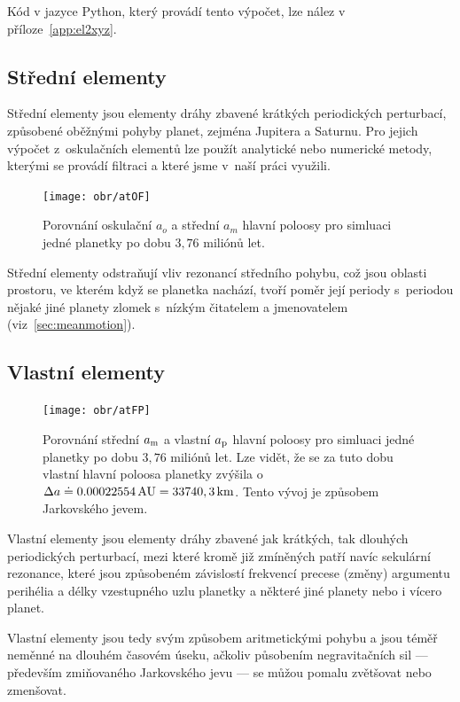 \documentclass[A4paper, 12pt, oneside]{book}%
\begin{document}
Kód v jazyce Python, který provádí tento výpočet, lze nález v příloze~\ref{app:el2xyz}.

\subsection{Střední elementy}
Střední elementy jsou elementy dráhy zbavené krátkých periodických perturbací, způsobené oběžnými pohyby planet, zejména Jupitera a Saturnu. Pro jejich výpočet z~oskulačních elementů lze použít analytické nebo numerické metody, kterými se provádí filtraci a které jsme v~naší práci využili. 

\begin{figure}
	\centering
	\texttt{[image: obr/atOF]}
	\caption{Porovnání oskulační $a_o$ a střední $a_m$ hlavní poloosy  pro simluaci jedné planetky po dobu $3,76$ miliónů let.}
	\label{atOF}
\end{figure}

Střední elementy odstraňují vliv rezonancí středního pohybu, což jsou oblasti prostoru, ve kterém když se planetka nachází, tvoří poměr její periody s~periodou nějaké jiné planety zlomek s~nízkým čitatelem a jmenovatelem (viz~\ref{sec:meanmotion}). 

\cite{quinn91}
\subsection{Vlastní elementy}

\begin{figure}[!htb]
	\centering
	\texttt{[image: obr/atFP]}
	\caption{Porovnání střední $a_{\rm m}$ a vlastní $a_{\rm p}$ hlavní poloosy pro simluaci jedné planetky po dobu $3,76$ miliónů let. Lze vidět, že se za tuto dobu vlastní hlavní poloosa planetky zvýšila o~$\Delta a\doteq0.00022554\,{\rm AU}=33740,3\, {\rm km}$. Tento vývoj je způsobem Jarkovského jevem.}
	\label{atFP}
\end{figure}

Vlastní elementy jsou elementy dráhy zbavené jak krátkých, tak dlouhých periodických perturbací, mezi které kromě již zmíněných patří navíc sekulární rezonance, které jsou způsobeném závislostí frekvencí precese (změny) argumentu perihélia a délky vzestupného uzlu planetky a některé jiné planety nebo i vícero planet.

Vlastní elementy jsou tedy svým způsobem aritmetickými  pohybu a jsou téměř neměnné na dlouhém časovém úseku, ačkoliv působením negravitačních sil --- především zmiňovaného Jarkovského jevu --- se můžou pomalu zvětšovat nebo zmenšovat. 
\end{document}
